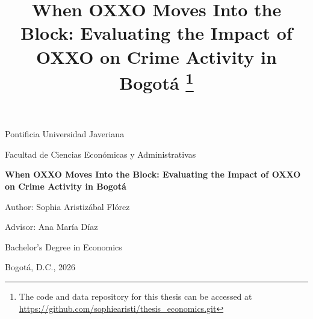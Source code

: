 \documentclass[12pt]{article}
\title{When OXXO Moves Into the Block: Evaluating the Impact of OXXO on Crime Activity in Bogotá
\footnote{The code and data repository for this thesis can be accessed at \url{https://github.com/sophiearisti/thesis_economics.git}} 
}
\author{}
\date{}
\begin{document}
\begin{titlepage}
    \centering
    \vspace*{2cm}
    
    {\Large Pontificia Universidad Javeriana \par}
    {\large Facultad de Ciencias Económicas y Administrativas \par}
    \vspace{2cm}
    
    {\Large\bfseries When OXXO Moves Into the Block: Evaluating the Impact of OXXO on Crime Activity in Bogotá \par}
    \vspace{1.5cm}
    
    {\large Author: Sophia Aristizábal Flórez \par}
    {\large Advisor: Ana María Díaz \par}
    \vspace{1.5cm}
    
    {\large Bachelor's Degree in Economics \par}
    
    \vfill
    {\large Bogotá, D.C., 2026 \par}
\end{titlepage}

\maketitle

\vspace*{-2 cm}
\onehalfspacing
\end{document}
